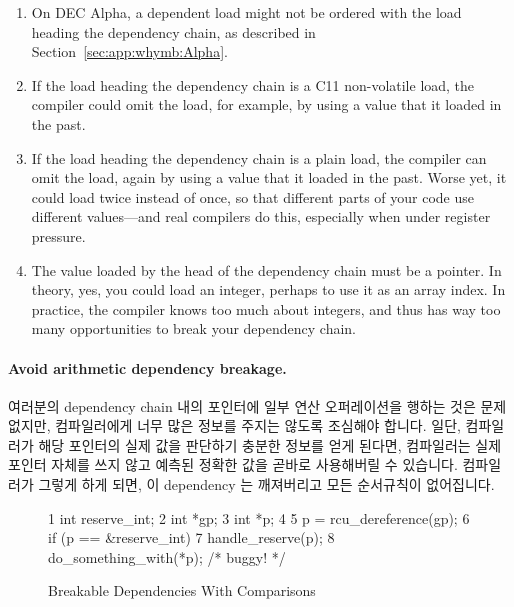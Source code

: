 \begin{enumerate}
\begin{enumerate}
\item	On DEC Alpha, a dependent load might not be ordered with
	the load heading the dependency chain, as described in
	Section~\ref{sec:app:whymb:Alpha}.
\item	If the load heading the dependency chain is a
	C11 non-volatile  load,
	the compiler could omit the load, for example, by using a value
	that it loaded in the past.
\item	If the load heading the dependency chain is a plain load,
	the compiler can omit the load, again by using a value
	that it loaded in the past.
	Worse yet, it could load twice instead of once, so that
	different parts of your code use different values---and
	real compilers do this, especially when under register
	pressure.
\item	The value loaded by the head of the dependency chain must
	be a pointer.
	In theory, yes, you could load an integer, perhaps to use
	it as an array index.
	In practice, the compiler knows too much about integers,
	and thus has way too many opportunities to break your
	dependency chain.
\fi
\end{enumerate}

\paragraph{Avoid arithmetic dependency breakage.}
여러분의 dependency chain 내의 포인터에 일부 연산 오퍼레이션을 행하는 것은
문제없지만, 컴파일러에게 너무 많은 정보를 주지는 않도록 조심해야 합니다.
일단, 컴파일러가 해당 포인터의 실제 값을 판단하기 충분한 정보를 얻게 된다면,
컴파일러는 실제 포인터 자체를 쓰지 않고 예측된 정확한 값을 곧바로 사용해버릴 수
있습니다.
컴파일러가 그렇게 하게 되면, 이 dependency 는 깨져버리고 모든 순서규칙이
없어집니다.

\begin{figure}[tbp]
{ \scriptsize
\begin{verbbox}
 1 int reserve_int;
 2 int *gp;
 3 int *p;
 4
 5 p = rcu_dereference(gp);
 6 if (p == &reserve_int)
 7   handle_reserve(p);
 8 do_something_with(*p); /* buggy! */
\end{verbbox}
}
\centering
\theverbbox
\caption{Breakable Dependencies With Comparisons}
\label{fig:advsync:Breakable Dependencies With Comparisons}
\end{figure}


\end{enumerate}
